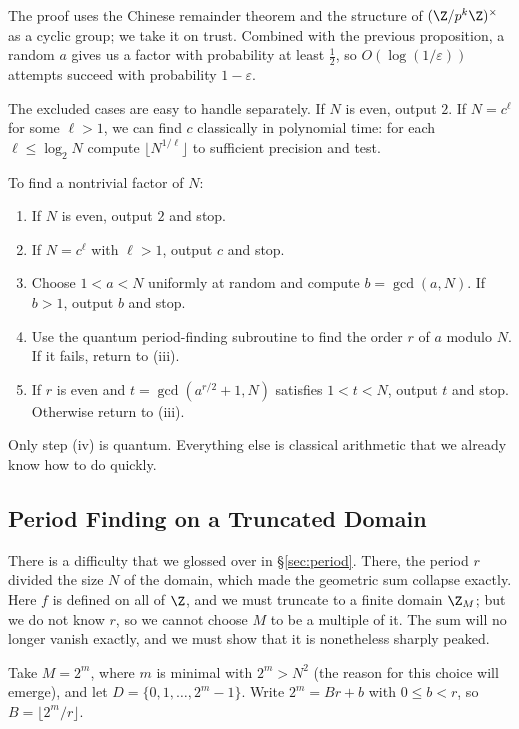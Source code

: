 The proof uses the Chinese remainder theorem and the structure of $(\Z/p^k\Z)^\times$ as a cyclic group; we take it on trust. Combined with the previous proposition, a random $a$ gives us a factor with probability at least $\tfrac12$, so $O(\log(1/\varepsilon))$ attempts succeed with probability $1-\varepsilon$.

The excluded cases are easy to handle separately. If $N$ is even, output $2$. If $N = c^\ell$ for some $\ell>1$, we can find $c$ classically in polynomial time: for each $\ell\leq\log_2N$ compute $\lfloor N^{1/\ell}\rfloor$ to sufficient precision and test.

\begin{method*}
	To find a nontrivial factor of $N$:
	\begin{enumerate}[label=(\roman*)]
		\item If $N$ is even, output $2$ and stop.
		\item If $N = c^\ell$ with $\ell>1$, output $c$ and stop.
		\item Choose $1<a<N$ uniformly at random and compute $b = \gcd(a,N)$. If $b>1$, output $b$ and stop.
		\item Use the quantum period-finding subroutine to find the order $r$ of $a$ modulo $N$. If it fails, return to (iii).
		\item If $r$ is even and $t = \gcd(a^{r/2}+1,N)$ satisfies $1<t<N$, output $t$ and stop. Otherwise return to (iii).
	\end{enumerate}
\end{method*}

Only step (iv) is quantum. Everything else is classical arithmetic that we already know how to do quickly.

\subsection{Period Finding on a Truncated Domain}

There is a difficulty that we glossed over in \S\ref{sec:period}. There, the period $r$ divided the size $N$ of the domain, which made the geometric sum collapse exactly. Here $f$ is defined on all of $\Z$, and we must truncate to a finite domain $\Z_M$; but we do not know $r$, so we cannot choose $M$ to be a multiple of it. The sum will no longer vanish exactly, and we must show that it is nonetheless sharply peaked.

Take $M = 2^m$, where $m$ is minimal with $2^m > N^2$ (the reason for this choice will emerge), and let $D = \{0,1,\dots,2^m-1\}$. Write $2^m = Br + b$ with $0\leq b<r$, so $B = \lfloor 2^m/r\rfloor$.

